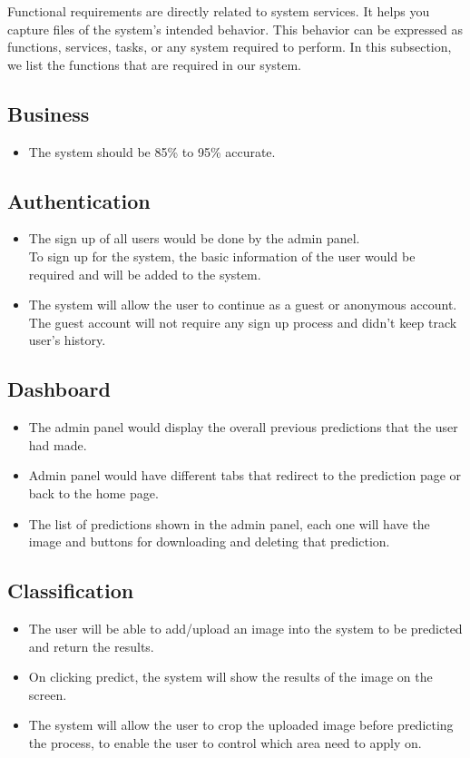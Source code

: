 Functional requirements are directly related to system services. It helps you capture files of the system’s intended behavior. This behavior can be expressed as functions, services, tasks, or any system required to perform. In this subsection, we list the functions that are required in our system.

\subsection{Business}
\begin{itemize}
  \item The system should be 85\% to 95\% accurate.
\end{itemize}

\subsection{Authentication}
\begin{itemize}
  \item The sign up of all users would be done by the admin panel. \\
        To sign up for the system, the basic information of the user would be required and will be added to the system.
  \item The system will allow the user to continue as a guest or anonymous account. \\
  The guest account will not require any sign up process and didn't keep track user's history.
\end{itemize}

\subsection{Dashboard}
\begin{itemize}
 \item The admin panel would display the overall previous predictions that the user had made.
 \item Admin panel would have different tabs that redirect to the prediction page or back to the home page.
 \item The list of predictions shown in the admin panel, each one will have the image and buttons for downloading and deleting that prediction.
\end{itemize}

\subsection{Classification}
\begin{itemize}
 \item The user will be able to add/upload an image into the system to be predicted and return the results.
 \item On clicking predict, the system will show the results of the image on the screen.
 \item The system will allow the user to crop the uploaded image before predicting the process, to enable the user to control which area need to apply on.
\end{itemize}

